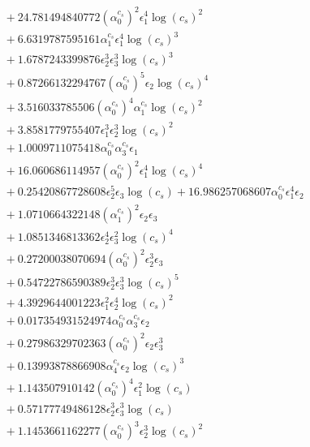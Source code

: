 \documentclass[10pt]{article}
\begin{document}
\begin{align*}
&{}  + 24.781494840772 \left(\alpha_{0}^{c_s}\right)^{2} \epsilon_{1}^{4} \log{\left(c_{s} \right)}^{2} \\
&{}  + 6.6319787595161 \alpha_{1}^{c_s} \epsilon_{1}^{4} \log{\left(c_{s} \right)}^{3} \\
&{}  + 1.6787243399876 \epsilon_{2}^{3} \epsilon_{3}^{3} \log{\left(c_{s} \right)}^{3} \\
&{}  + 0.87266132294767 \left(\alpha_{0}^{c_s}\right)^{5} \epsilon_{2} \log{\left(c_{s} \right)}^{4} \\
&{}  + 3.516033785506 \left(\alpha_{0}^{c_s}\right)^{4} \alpha_{1}^{c_s} \log{\left(c_{s} \right)}^{2} \\
&{}  + 3.8581779755407 \epsilon_{1}^{3} \epsilon_{2}^{3} \log{\left(c_{s} \right)}^{2} \\
&{}  + 1.0009711075418 \alpha_{0}^{c_s} \alpha_{3}^{c_s} \epsilon_{1} \\
&{}  + 16.060686114957 \left(\alpha_{0}^{c_s}\right)^{2} \epsilon_{1}^{4} \log{\left(c_{s} \right)}^{4} \\
&{}  + 0.25420867728608 \epsilon_{2}^{5} \epsilon_{3} \log{\left(c_{s} \right)} + 16.986257068607 \alpha_{0}^{c_s} \epsilon_{1}^{4} \epsilon_{2} \\
&{}  + 1.0710664322148 \left(\alpha_{1}^{c_s}\right)^{2} \epsilon_{2} \epsilon_{3} \\
&{}  + 1.0851346813362 \epsilon_{2}^{4} \epsilon_{3}^{2} \log{\left(c_{s} \right)}^{4} \\
&{}  + 0.27200038070694 \left(\alpha_{0}^{c_s}\right)^{2} \epsilon_{2}^{3} \epsilon_{3} \\
&{}  + 0.54722786590389 \epsilon_{2}^{3} \epsilon_{3}^{3} \log{\left(c_{s} \right)}^{5} \\
&{}  + 4.3929644001223 \epsilon_{1}^{2} \epsilon_{2}^{4} \log{\left(c_{s} \right)}^{2} \\
&{}  + 0.017354931524974 \alpha_{0}^{c_s} \alpha_{3}^{c_s} \epsilon_{2} \\
&{}  + 0.27986329702363 \left(\alpha_{0}^{c_s}\right)^{2} \epsilon_{2} \epsilon_{3}^{3} \\
&{}  + 0.13993878866908 \alpha_{4}^{c_s} \epsilon_{2} \log{\left(c_{s} \right)}^{3} \\
&{}  + 1.143507910142 \left(\alpha_{0}^{c_s}\right)^{4} \epsilon_{1}^{2} \log{\left(c_{s} \right)} \\
&{}  + 0.57177749486128 \epsilon_{2}^{3} \epsilon_{3}^{3} \log{\left(c_{s} \right)} \\
&{}  + 1.1453661162277 \left(\alpha_{0}^{c_s}\right)^{3} \epsilon_{2}^{3} \log{\left(c_{s} \right)}^{2} \\

\end{align*}
\end{document}
